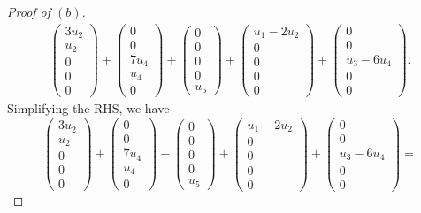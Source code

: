 \documentclass[11pt]{extarticle}
\begin{document}
\begin{proof}[Proof of $(b)$]
\begin{multline*}
\begin{pmatrix} 3u_2 \\ u_2 \\ 0 \\ 0\\ 0 \end{pmatrix} + \begin{pmatrix} 0 \\ 0 \\ 7u_4 \\ u_4 \\ 0 \end{pmatrix} + \begin{pmatrix} 0 \\ 0 \\ 0 \\ 0 \\ u_5 \end{pmatrix} + \begin{pmatrix} u_1 -2u_2\\ 0 \\ 0 \\ 0 \\ 0 \end{pmatrix} + \begin{pmatrix} 0 \\ 0 \\ u_3 - 6u_4 \\ 0 \\ 0 \end{pmatrix}.
\end{multline*}
Simplifying the RHS, we have
\begin{equation*}
\begin{pmatrix} 3u_2 \\ u_2 \\ 0 \\ 0\\ 0 \end{pmatrix} + \begin{pmatrix} 0 \\ 0 \\ 7u_4 \\ u_4 \\ 0 \end{pmatrix} + \begin{pmatrix} 0 \\ 0 \\ 0 \\ 0 \\ u_5 \end{pmatrix} + \begin{pmatrix} u_1 -2u_2\\ 0 \\ 0 \\ 0 \\ 0 \end{pmatrix} + \begin{pmatrix} 0 \\ 0 \\ u_3 - 6u_4 \\ 0 \\ 0 \end{pmatrix} = 

\end{equation*}
\end{proof}
\end{document}
